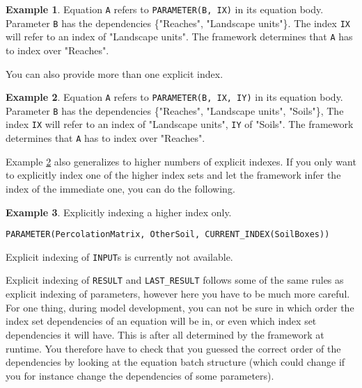 \documentclass[11pt]{article}
\theoremstyle{definition}
\newtheorem{myexample}{Example}
\newenvironment{example}%
  {\begin{lrbox}{\examplebox}%
   \begin{minipage}{\dimexpr\linewidth-2\fboxsep}
   \begin{myexample}}%
  {\end{myexample}%
   \end{minipage}%
   \end{lrbox}%
   \begin{trivlist}
     \item[]\colorbox{silver}{\usebox\examplebox}
   \end{trivlist}}
\begin{document}
\begin{example}
Equation {\tt A} refers to {\tt PARAMETER(B, IX)} in its equation body. Parameter {\tt B} has the dependencies \{"Reaches", "Landscape units"\}. The index {\tt IX} will refer to an index of "Landscape units". The framework determines that {\tt A} has to index over "Reaches".
\end{example}

You can also provide more than one explicit index.

\begin{example}\label{ex:multipleexplicitindexes}
Equation {\tt A} refers to {\tt PARAMETER(B, IX, IY)} in its equation body. Parameter {\tt B} has the dependencies \{"Reaches", "Landscape units", "Soils"\}, The index {\tt IX} will refer to an index of "Landscape units", {\tt IY} of "Soils". The framework determines that {\tt A} has to index over "Reaches".
\end{example}

Example \ref{ex:multipleexplicitindexes} also generalizes to higher numbers of explicit indexes. If you only want to explicitly index one of the higher index sets and let the framework infer the index of the immediate one, you can do the following.

\begin{example}
Explicitly indexing a higher index only.
\begin{lstlisting}[style=mycpp]
PARAMETER(PercolationMatrix, OtherSoil, CURRENT_INDEX(SoilBoxes))
\end{lstlisting}
\end{example}

Explicit indexing of {\tt INPUT}s is currently not available.

Explicit indexing of {\tt RESULT} and {\tt LAST\_RESULT} follows some of the same rules as explicit indexing of parameters, however here you have to be much more careful. For one thing, during model development, you can not be sure in which order the index set dependencies of an equation will be in, or even which index set dependencies it will have. This is after all determined by the framework at runtime. You therefore have to check that you guessed the correct order of the dependencies by looking at the equation batch structure (which could change if you for instance change the dependencies of some parameters).
\end{document}
